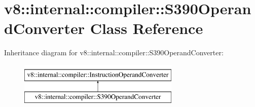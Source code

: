 \hypertarget{classv8_1_1internal_1_1compiler_1_1S390OperandConverter}{}\section{v8\+:\+:internal\+:\+:compiler\+:\+:S390\+Operand\+Converter Class Reference}
\label{classv8_1_1internal_1_1compiler_1_1S390OperandConverter}
Inheritance diagram for v8\+:\+:internal\+:\+:compiler\+:\+:S390\+Operand\+Converter\+:\begin{figure}[H]
\begin{center}
\leavevmode
\includegraphics[height=2.000000cm]{classv8_1_1internal_1_1compiler_1_1S390OperandConverter}
\end{center}
\end{figure}
